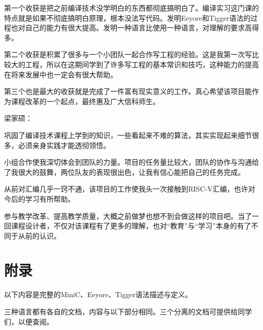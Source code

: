 \documentclass[a4paper]{ctexart}
\begin{document}
第一个收获是把之前编译技术没学明白的东西都彻底搞明白了。编译实习这门课的特点就是如果不彻底搞明白原理，根本没法写代码。发明Eeyore和Tigger语法的过程也对自己的能力有很大提高。发明一种语言比使用一种语言，对理解的要求高得多。

第二个收获是积累了很多与一个小团队一起合作写工程的经验。这是我第一次写比较大的工程，所以在这期间学到了许多写工程的基本常识和技巧，这种能力的提高在将来发展中也一定会有很大帮助。

第三个也是最大的收获就是完成了一件富有现实意义的工作。真心希望该项目能作为课程改革的一个起点，最终惠及广大信科师生。

\bigskip
\noindent 梁家硕：

巩固了编译技术课程上学到的知识，一些看起来不难的算法，其实实现起来细节很多，必须亲身实践才能透彻领悟。

小组合作使我深切体会到团队的力量。项目的任务量比较大，团队的协作与沟通给了我很大的鼓舞，两位队友的表现很出色，让我有信心能把自己的任务完成。

从前对汇编几乎一窍不通，该项目的工作使我头一次接触到RISC-V汇编，也许对今后的学习有所帮助。

参与教学改革、提高教学质量，大概之前做梦也想不到会做这样的项目吧。当了一回课程设计者，不仅对该课程有了更多的理解，也对“教育”与“学习”本身的有了不同于从前的认识。

\newpage
\section{附录}
以下内容是完整的MiniC、Eeyore、Tigger语法描述与定义。

三种语言都有各自的文档，内容与以下部分相同。三个分离的文档可提供给同学们，以便查阅。

\newpage

\newpage

\end{document}

